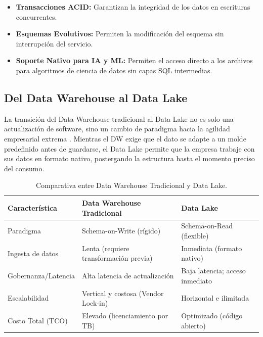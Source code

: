\begin{itemize}
    \item \textbf{Transacciones ACID:} Garantizan la integridad de los datos en escrituras concurrentes.
    \item \textbf{Esquemas Evolutivos:} Permiten la modificación del esquema sin interrupción del servicio.
    \item \textbf{Soporte Nativo para IA y ML:} Permiten el acceso directo a los archivos para algoritmos de ciencia de datos sin capas SQL intermedias.
\end{itemize}

\subsection{Del Data Warehouse al Data Lake}

La transición del Data Warehouse tradicional al Data Lake no es solo una actualización de software, sino un cambio de paradigma hacia la agilidad empresarial extrema \parencite{tagarro2019desarrollo}. Mientras el DW exige que el dato se adapte a un molde predefinido antes de guardarse, el Data Lake permite que la empresa trabaje con sus datos en formato nativo, postergando la estructura hasta el momento preciso del consumo.

\begin{table}[H]
    \caption{Comparativa entre Data Warehouse Tradicional y Data Lake.}
    \label{tab:dw-vs-dl}
    \centering
    \begin{tabular}{p{4cm} p{5cm} p{5cm}}
        \toprule
        \textbf{Característica} & \textbf{Data Warehouse Tradicional} & \textbf{Data Lake} \\
        \midrule
        Paradigma           & Schema-on-Write (rígido)               & Schema-on-Read (flexible) \\
        Ingesta de datos    & Lenta (requiere transformación previa) & Inmediata (formato nativo) \\
        Gobernanza/Latencia & Alta latencia de actualización          & Baja latencia; acceso inmediato \\
        Escalabilidad       & Vertical y costosa (Vendor Lock-in)    & Horizontal e ilimitada \\
        Costo Total (TCO)   & Elevado (licenciamiento por TB)        & Optimizado (código abierto) \\
        \bottomrule
    \end{tabular}
\end{table}


